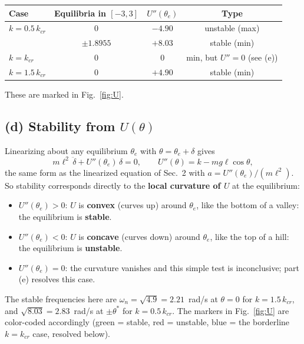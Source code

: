 \documentclass[11pt]{article}
\newcommand{\kcr}{k_{cr}}
\begin{document}
\begin{center}
\begin{tabular}{@{}lccc@{}}
\toprule
Case & Equilibria in $[-3,3]$ & $U''(\theta_e)$ & Type \\
\midrule
$k=0.5\,\kcr$ & $0$ & $-4.90$ & unstable (max) \\
              & $\pm1.8955$ & $+8.03$ & stable (min) \\
$k=\kcr$      & $0$ & $0$ & min, but $U''=0$ (see (e)) \\
$k=1.5\,\kcr$ & $0$ & $+4.90$ & stable (min) \\
\bottomrule
\end{tabular}
\end{center}
These are marked in Fig.~\ref{fig:U}.

\subsection*{(d) Stability from $U(\theta)$}
Linearizing about any equilibrium $\theta_e$ with $\theta=\theta_e+\delta$ gives
\[
  m\ell^2\,\ddot\delta + U''(\theta_e)\,\delta = 0 ,
  \qquad U''(\theta) = k - mg\ell\cos\theta ,
\]
the same form as the linearized equation of Sec.~2 with $a = U''(\theta_e)/(m\ell^2)$. So stability corresponds directly to the \textbf{local curvature of $U$} at the equilibrium:
\begin{itemize}
  \item $U''(\theta_e)>0$: $U$ is \textbf{convex} (curves up) around $\theta_e$, like the bottom of a valley: the equilibrium is \textbf{stable}.
  \item $U''(\theta_e)<0$: $U$ is \textbf{concave} (curves down) around $\theta_e$, like the top of a hill: the equilibrium is \textbf{unstable}.
  \item $U''(\theta_e)=0$: the curvature vanishes and this simple test is inconclusive; part (e) resolves this case.
\end{itemize}
The stable frequencies here are $\omega_n=\sqrt{4.9}=2.21$~rad/s at $\theta=0$ for $k=1.5\,\kcr$, and $\sqrt{8.03}=2.83$~rad/s at $\pm\theta^*$ for $k=0.5\,\kcr$. The markers in Fig.~\ref{fig:U} are color-coded accordingly (green = stable, red = unstable, blue = the borderline $k=\kcr$ case, resolved below).
\end{document}
